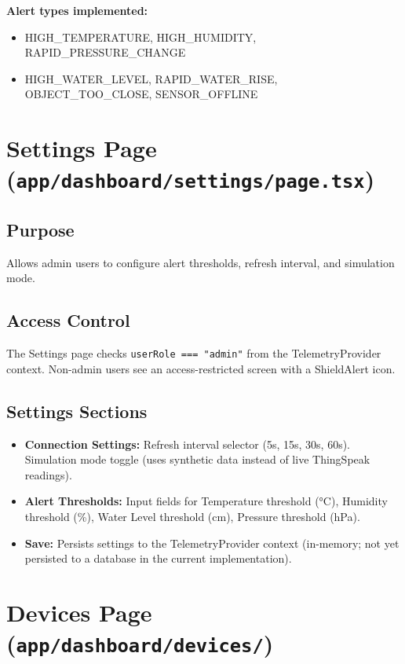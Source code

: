 \textbf{Alert types implemented:}
\begin{itemize}[leftmargin=1.5em]
  \item HIGH\_TEMPERATURE, HIGH\_HUMIDITY, RAPID\_PRESSURE\_CHANGE
  \item HIGH\_WATER\_LEVEL, RAPID\_WATER\_RISE, OBJECT\_TOO\_CLOSE, SENSOR\_OFFLINE
\end{itemize}

\section{Settings Page (\texttt{app/\allowbreak{}dashboard/\allowbreak{}settings/\allowbreak{}page.\allowbreak{}tsx})}

\subsection{Purpose}
Allows admin users to configure alert thresholds, refresh interval, and simulation mode.

\subsection{Access Control}
The Settings page checks \texttt{userRole === "admin"} from the TelemetryProvider context. Non-admin users see an access-restricted screen with a ShieldAlert icon.

\subsection{Settings Sections}
\begin{itemize}[leftmargin=1.5em]
  \item \textbf{Connection Settings:} Refresh interval selector (5s, 15s, 30s, 60s). Simulation mode toggle (uses synthetic data instead of live ThingSpeak readings).
  \item \textbf{Alert Thresholds:} Input fields for Temperature threshold (°C), Humidity threshold (\%), Water Level threshold (cm), Pressure threshold (hPa).
  \item \textbf{Save:} Persists settings to the TelemetryProvider context (in-memory; not yet persisted to a database in the current implementation).
\end{itemize}

\section{Devices Page (\texttt{app/\allowbreak{}dashboard/\allowbreak{}devices/\allowbreak{}})}


